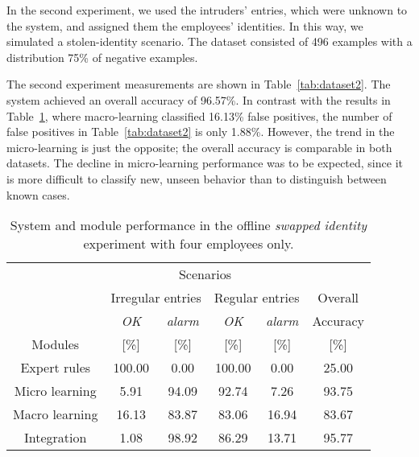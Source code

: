 In the second experiment, we used the intruders' entries, which were unknown to the system, and assigned them the employees' identities. In this way, we simulated a stolen-identity scenario. The dataset consisted of 496 examples with a distribution 75\% of negative examples.

The second experiment measurements are shown in Table~\ref{tab:dataset2}. The system achieved an overall accuracy of 96.57\%. In contrast with the results in Table~\ref{tab:dataset1}, where macro-learning classified 16.13\% false positives, the number of false positives in Table~\ref{tab:dataset2} is only 1.88\%. However, the trend in the micro-learning is just the opposite; the overall accuracy is comparable in both datasets. The decline in micro-learning performance was to be expected, since it is more difficult to classify new, unseen behavior than to distinguish between known cases.

\begin{table}[!ht]
\centering

\begin{tabular}{cccccc}
\toprule
\multicolumn{ 1}{c}{} &                   \multicolumn{ 4}{c}{Scenarios} &            \\
		& \multicolumn{ 2}{c}{Irregular entries} & \multicolumn{ 2}{c}{Regular entries} &   Overall  \\
 		&   {\it OK} & {\it alarm} &   {\it OK} & {\it alarm} &   Accuracy \\
Modules	&   [\%] & [\%] &   [\%] & [\%] &  [\%] \\
\hline
Expert rules &   100.00 &     0.00 &   100.00 &     0.00 &    25.00 \\

Micro learning &     5.91 &    94.09 &    92.74 &     7.26 &    93.75 \\

Macro learning &    16.13 &    83.87 &    83.06 &    16.94 &    83.67 \\
\hline
Integration &     1.08 &    98.92 &    86.29 &    13.71 &    95.77 \\
\toprule
\end{tabular}  
 
\caption{System and module performance in the offline \textit{swapped identity} experiment with four employees only.}
\label{tab:dataset1}
\end{table}

